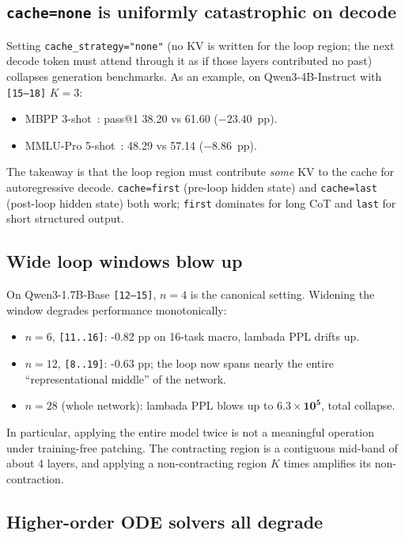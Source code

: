 \subsection{\texttt{cache=none} is uniformly catastrophic on decode}

Setting \texttt{cache\_strategy="none"} (no KV is written for the loop region; the next decode token must attend through it as if those layers contributed no past) collapses generation benchmarks. As an example, on Qwen3-4B-Instruct with \texttt{[15--18]} $K{=}3$:

\begin{itemize}
\item MBPP 3-shot~\citep{austin2021mbpp}: pass@1 38.20 vs 61.60 ($-23.40$~pp).
\item MMLU-Pro 5-shot~\citep{wang2024mmlupro}: 48.29 vs 57.14 ($-8.86$~pp).
\end{itemize}

The takeaway is that the loop region must contribute \emph{some} KV to the cache for autoregressive decode. \texttt{cache=first} (pre-loop hidden state) and \texttt{cache=last} (post-loop hidden state) both work; \texttt{first} dominates for long CoT and \texttt{last} for short structured output.

\subsection{Wide loop windows blow up}

On Qwen3-1.7B-Base \texttt{[12--15]}, $n{=}4$ is the canonical setting. Widening the window degrades performance monotonically:
\begin{itemize}
\item $n{=}6$, \texttt{[11..16]}: -0.82 pp on 16-task macro, lambada PPL drifts up.
\item $n{=}12$, \texttt{[8..19]}: -0.63 pp; the loop now spans nearly the entire ``representational middle'' of the network.
\item $n{=}28$ (whole network): lambada PPL blows up to $\mathbf{6.3 \times 10^5}$, total collapse.
\end{itemize}
In particular, applying the entire model twice is not a meaningful operation under training-free patching. The contracting region is a contiguous mid-band of about 4 layers, and applying a non-contracting region $K$ times amplifies its non-contraction.

\subsection{Higher-order ODE solvers all degrade}

